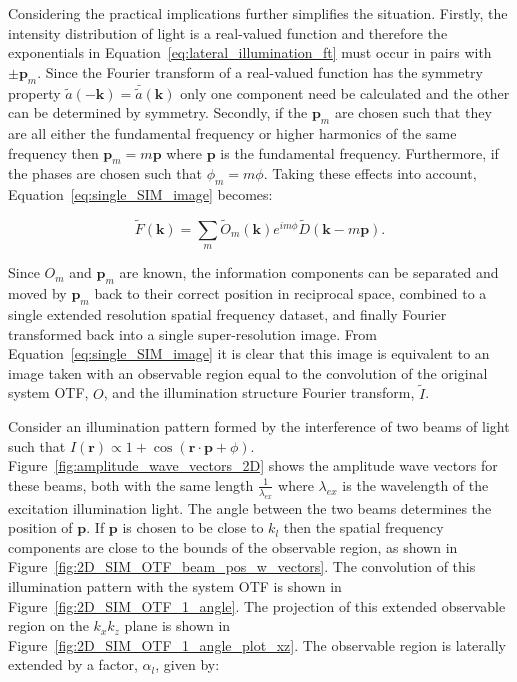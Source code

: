 Considering the practical implications further simplifies the situation. 
Firstly, the intensity distribution of light is a real-valued function and
therefore the exponentials in Equation~\ref{eq:lateral_illumination_ft} must
occur in pairs with $\pm\textbf{p}_{m}$. Since the Fourier transform of a 
real-valued function has the symmetry property $\tilde{a}(-\textbf{k}) = 
\bar{\tilde{a}}(\textbf{k})$ only one component need be calculated and the
other can be determined by symmetry. Secondly, if the $\textbf{p}_{m}$ are
chosen such that they are all either the fundamental frequency or higher 
harmonics of the same frequency then $\textbf{p}_{m} = m\textbf{p}$ where
$\textbf{p}$ is the fundamental frequency. Furthermore, if the phases are 
chosen such that $\phi_{m} = m\phi$. Taking these effects into account, 
Equation~\ref{eq:single_SIM_image} becomes:

\begin{equation}\label{eq:single_SIM_image_simple}
\tilde{F}(\textbf{k}) = \sum\limits_{m}{\tilde{O}_{m}(\textbf{k})e^{im\phi}\tilde{D}\left(\textbf{k} - m\textbf{p}\right)}.
\end{equation}

Since $O_{m}$ and $\textbf{p}_{m}$ are known, the information components
can be separated and moved by $\textbf{p}_{m}$ back to their correct 
position in reciprocal space, combined to a single extended resolution
spatial frequency dataset, and finally Fourier transformed back into a 
single super-resolution image.  From Equation~\ref{eq:single_SIM_image} 
it is clear that this image is equivalent to an image taken with an 
observable region equal to the convolution of the original system OTF, 
$O$, and the illumination structure Fourier transform, $\tilde{I}$. 

Consider an illumination pattern formed by the interference of two beams 
of light such that $I(\textbf{r}) \propto 1 + \cos(\textbf{r}\cdot
\textbf{p} + \phi)$. Figure~\ref{fig:amplitude_wave_vectors_2D} shows 
the amplitude wave vectors for these beams, both with the same length 
$\frac{1}{\lambda_{ex}}$ where $\lambda_{ex}$ is the wavelength of the 
excitation illumination light. The angle between the two beams determines 
the position of $\textbf{p}$. If $\textbf{p}$ is chosen to be close to 
$k_{l}$ then the spatial frequency components are close to the bounds 
of the observable region, as shown in 
Figure~\ref{fig:2D_SIM_OTF_beam_pos_w_vectors}. The convolution of this 
illumination pattern with the system OTF is shown in 
Figure~\ref{fig:2D_SIM_OTF_1_angle}. The projection of this extended 
observable region on the $k_{x}k_{z}$ plane is shown in 
Figure~\ref{fig:2D_SIM_OTF_1_angle_plot_xz}. The observable region
is laterally extended by a factor, $\alpha_{l}$, given by:

